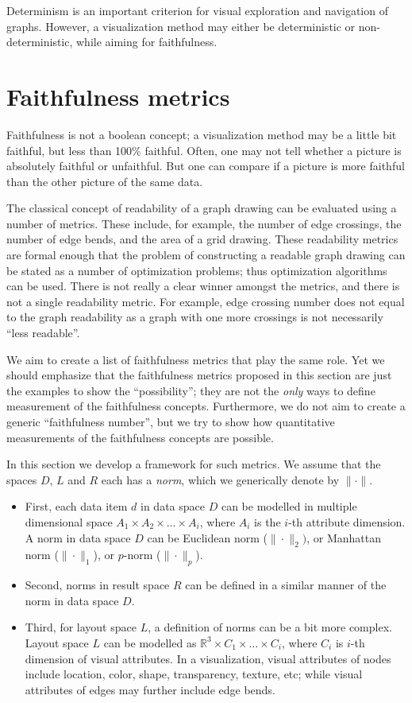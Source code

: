 \documentclass[10pt,journal,cspaper,compsoc]{IEEEtran}
\begin{document}
Determinism is an important criterion for visual exploration and navigation of graphs. However, a visualization method may either be deterministic or non-deterministic, while aiming for faithfulness.




\section{Faithfulness metrics \label{sec:vizmetrics}}

Faithfulness is not a boolean concept; a visualization method may be a little bit faithful, but less than 100\% faithful.
Often, one may not tell whether a picture is absolutely faithful or unfaithful. But one can compare if a picture is more faithful than the other picture of the same data.

The classical concept of readability of a graph drawing can be evaluated using a number of metrics. These include, for example, the number of edge crossings, the number of edge bends, and the area of a grid drawing. These readability metrics are formal enough that the problem of constructing a readable graph drawing can be stated as a number of optimization problems; thus optimization algorithms can be used. There is not really a clear winner amongst the metrics, and there is not a single readability metric. For example, edge crossing number does not equal to the graph readability as a graph with one more crossings is not necessarily ``less readable''.

We aim to create a list of faithfulness metrics that play the same role. Yet we should emphasize that the faithfulness metrics proposed in this section are just the examples to show the ``possibility''; they are not the \emph{only} ways to define measurement of the faithfulness concepts. Furthermore, we do not aim to create a generic ``faithfulness number'', but we try to show how quantitative measurements of the faithfulness concepts are possible.

In this section we develop a framework for such metrics.
We assume that the spaces $D$, $L$ and $R$ each has a \emph{norm}, which we generically denote by $\| \cdot \|$.
\begin{itemize}
\item 
First, each data item $d$ in data space $D$ can be modelled in multiple dimensional space $A_1 \times A_2 \times \dots \times A_i$, where $A_i$ is the $i$-th attribute dimension. A norm in data space $D$ can be Euclidean norm ($\| \cdot \|_2)$, or Manhattan norm ($\| \cdot \|_1$), or $p$-norm ($\| \cdot \|_p$). 
\item
Second, norms in result space $R$ can be defined in a similar manner of the norm in data space $D$. 
\item
Third, for layout space $L$, a definition of norms can be a bit more complex. Layout space $L$ can be modelled as $\mathbb{R}^3 \times C_1 \times \dots \times C_i$, where $C_i$ is $i$-th dimension of visual attributes. In a visualization, visual attributes of nodes include location, color, shape, transparency, texture, etc; while visual attributes of edges may further include edge bends.
\end{itemize}
\end{document}

